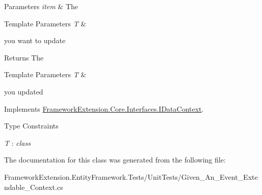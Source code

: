 \begin{DoxyParams}{Parameters}
{\em item} & The 
\begin{DoxyTemplParams}{Template Parameters}
{\em T} & \\
\hline
\end{DoxyTemplParams}
you want to update\\
\hline
\end{DoxyParams}
\begin{DoxyReturn}{Returns}
The 
\begin{DoxyTemplParams}{Template Parameters}
{\em T} & \\
\hline
\end{DoxyTemplParams}
you updated
\end{DoxyReturn}


Implements \hyperlink{interface_framework_extension_1_1_core_1_1_interfaces_1_1_i_data_context_a1297c0d6e59ec05855d8e25a72f49fdd}{Framework\-Extension.\-Core.\-Interfaces.\-I\-Data\-Context}.

\begin{Desc}
\item[Type Constraints]\begin{description}
\item[{\em T} : {\em class}]\end{description}
\end{Desc}


The documentation for this class was generated from the following file\-:\begin{DoxyCompactItemize}
\item 
Framework\-Extension.\-Entity\-Framework.\-Tests/\-Unit\-Tests/Given\-\_\-\-An\-\_\-\-Event\-\_\-\-Extendable\-\_\-\-Context.\-cs\end{DoxyCompactItemize}
